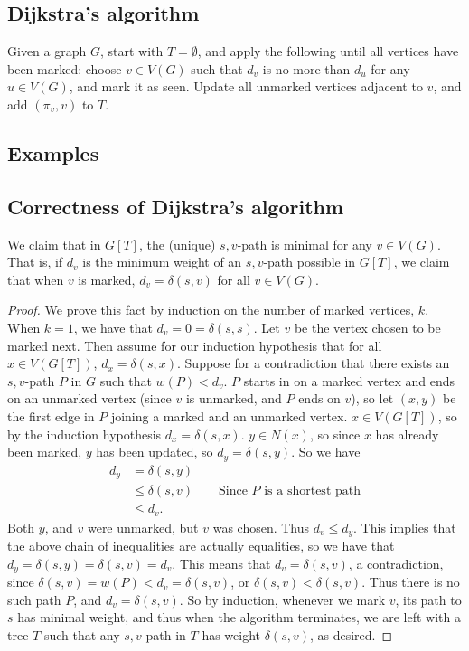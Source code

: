 \documentclass[11pt]{article}
\begin{document}
\subsection{Dijkstra's algorithm}
Given a graph $G$, start with $T=\emptyset$, and apply the following until all
vertices have been marked: choose $v\in V(G)$ such that $d_v$ is no more than
$d_u$ for any $u\in V(G)$, and mark it as seen. Update all unmarked vertices
adjacent to $v$, and add $(\pi_v,v)$ to $T$.\cite{MST}


\subsection{Examples}
\begin{figure}[H]

\end{figure}
\begin{figure}[H]

\end{figure}
\begin{figure}[H]

\end{figure}


\subsection{Correctness of Dijkstra's algorithm}
We claim that in $G[T]$, the (unique) $s,v$-path is minimal for any $v\in V(G)$.
That is, if $d_v$ is the minimum weight of an $s,v$-path possible in $G[T]$, we
claim that when $v$ is marked, $d_v=\delta(s,v)$ for all $v\in V(G)$.
\begin{proof}
	We prove this fact by induction on the number of marked vertices, $k$. When $k=1$, we have
	that $d_v=0=\delta(s,s)$. Let $v$ be the vertex chosen to be marked next.
	Then assume for our induction hypothesis that for all
	$x\in V(G[T])$, $d_x=\delta(s,x)$. Suppose for a contradiction that there
	exists an $s,v$-path $P$ in $G$  such that $w(P)<d_v$. $P$
	starts in on a marked vertex and ends on an unmarked vertex (since $v$ is unmarked, and
	$P$ ends on $v$), so let $(x,y)$ be the first edge in $P$ joining a marked and an unmarked vertex.
	$x\in V(G[T])$, so by the induction hypothesis $d_x=\delta(s,x)$.
	$y\in N(x)$, so since $x$ has already been marked, $y$ has been updated, so
	$d_y=\delta(s,y)$. So we have
	\begin{align*}
		d_y&=\delta(s,y)\\
		&\le\delta(s,v)\qquad\text{Since $P$ is a shortest path}\\
		&\le d_v.
	\end{align*}
	Both $y$, and $v$ were unmarked, but $v$ was chosen. Thus
	$d_v\le d_y$. This implies that the above chain of inequalities are actually
	equalities, so we have that $d_y=\delta(s,y)=\delta(s,v)=d_v$. This means
	that $d_v=\delta(s,v)$, a contradiction, since
	$\delta(s,v)=w(P)<d_v=\delta(s,v)$, or $\delta(s,v)<\delta(s,v)$. Thus there
	is no such path $P$, and $d_v=\delta(s,v)$. So by induction, whenever we
	mark $v$, its path to $s$ has minimal weight, and thus when the
	algorithm terminates, we are left with a tree $T$ such that any $s,v$-path
	in $T$ has weight $\delta(s,v)$, as desired.\cite{Dijkstra}\cite{CLRS}
\end{proof}
\end{document}
